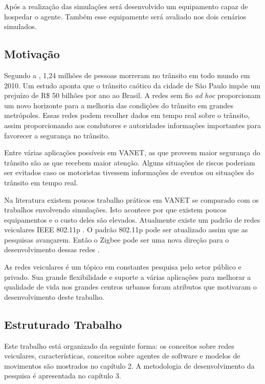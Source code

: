 Após a realização das simulações será desenvolvido um equipamento capaz de hospedar o agente. Também esse equipamente será avaliado nos dois cenários simulados.  

\subsection{Motivação}

Segundo a \cite{oms:2013}, 1,24 milhões de pessoas morreram no trânsito em todo mundo em 2010. Um estudo \cite{Cintra:2012} aponta que o trânsito caótico da cidade de São Paulo impõe um prejuízo de R\$ 50 bilhões por ano ao Brasil. A redes sem fio \emph{ad hoc} proporcionam um novo horizonte para a melhoria das condições do trânsito em grandes metrópoles. Essas redes podem recolher dados em tempo real sobre o trânsito, assim proporcionando aos condutores e autoridades informações importantes para favorecer a segurança no trânsito.  	

Entre várias aplicações possíveis em VANET, as que proveem maior segurança do trânsito são as que recebem maior atenção. Alguns situações de riscos poderiam ser evitados caso os motoristas tivessem informações de eventos ou situações do trânsito em tempo real.

Na literatura existem poucos trabalho práticos em VANET se comparado com os trabalhos envolvendo simulações. Isto acontece por que existem poucos equipamentos e o custo deles são elevados. Atualmente existe um padrão de redes veiculares IEEE 802.11p \cite{Jiang:2008}. O padrão 802.11p pode ser atualizado assim que as pesquisas avançarem. Então o Zigbee pode ser uma nova direção para o desenvolvimento dessas redes \cite{Bhargav:2013}. 

As redes veiculares é um tópico em constantes pesquisa pelo setor público e privado. Sua grande flexibilidade e suporte a várias aplicações para melhorar a qualidade de vida nos grandes centros urbanos foram atributos que motivaram o desenvolvimento deste trabalho.

\subsection{Estruturado Trabalho}

Este trabalho está organizado da seguinte forma: os conceitos sobre redes veiculares, características, conceitos sobre agentes de software e modelos de movimentos são mostrados no capítulo 2. A metodologia de desenvolvimento da pesquisa é apresentada no capítulo 3.
